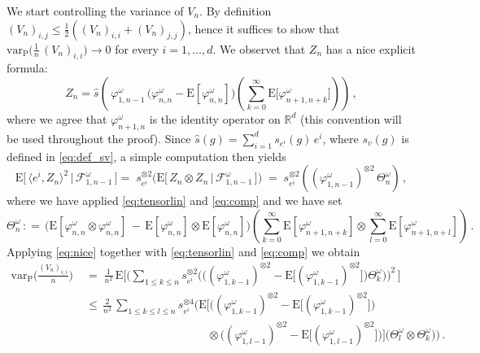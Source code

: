 \documentclass[a4paper,reqno,11pt]{amsart}
\numberwithin{equation}{section}
\newcommand{\cF}{{\ensuremath{\mathcal F}} }
\newcommand{\go}{\omega}
\newcommand{\R}{\mathbb{R}}
\def\bP{\ensuremath{\bs{\mathrm{P}}}}
\def\bE{\ensuremath{\bs{\mathrm{E}}}}
\def\bs{\boldsymbol}
\renewcommand{\phi}{\varphi}
\begin{document}
We start controlling the variance of $V_n$. By definition
$(V_n)_{i,j} \le \frac 12 ((V_n)_{i,i} + (V_n)_{j,j})$,
hence it suffices to show that
$\mathrm{var}_{\bP} \big( \frac 1n \, (V_n)_{i,i} \big) \to 0$
for every $i = 1, \ldots, d$.
We observet that $Z_n$ has a nice explicit formula:
\begin{equation}
Z_n = \hat s \left( \, \phi_{1,n-1}^\go
\, \big( \phi_{n,n}^\go - \bE [\phi_{n,n}^\go] \big) 
\left( \sum_{k=0}^\infty  \bE \big[ \phi_{n+1,n+k}^\go \big] \right) \right)\,,
\end{equation}
where we agree that $\phi_{n+1,n}^\go$ is the identity operator on $\R^d$
(this convention will be used throughout the proof).
Since $\hat s(g) = \sum_{i=1}^d s_{e^i}(g) \, e^i$,
where $s_v(g)$ is defined in \eqref{eq:def_sv}, a simple computation
then yields
\begin{equation} \label{eq:nice}
	\bE\big[\, \langle e^i,Z_n\rangle^2 \,\big|\, \cF_{1,n-1}^\go \,\big] 
	=\; s_{e^i}^{\otimes 2} \big(
	\bE\big[\, Z_n \otimes Z_n \,\big|\, \cF_{1,n-1}^\go \,\big] \big)
	\;=\; s_{e^i}^{\otimes 2}
	\left((\phi_{1,n-1}^\go)^{\otimes 2} \, \Theta^\go_n  \right) \,,
\end{equation}
where we have applied \eqref{eq:tensorlin} and \eqref{eq:comp} and we have set
\begin{equation}
\Theta^\go_n \,: =\,  \big( \bE[ \phi_{n,n}^\go \otimes \phi_{n,n}^\go] 
  \,-\, \bE [\phi_{n,n}^\go] \otimes \bE [\phi_{n,n}^\go] \big) \left(
  \sum_{k=0}^\infty \bE[\phi_{n+1,n+k}^\go] \otimes
  \sum_{l=0}^\infty  \bE [\phi_{n+1,n+l}^\go]  \right) \,.
\end{equation}
Applying \eqref{eq:nice} together with \eqref{eq:tensorlin} and \eqref{eq:comp}
we obtain
\begin{align}
	\mathrm{var}_{\bP} \bigg( \frac{(V_n)_{i,i}}{n} \bigg)
	& \;=\; \frac{1}{n^2} \, \bE \Bigg[ \Bigg( \sum_{1 \le k \le n} 
	s_{e^i}^{\otimes 2}
	\Big( \big( (\phi_{1,k-1}^\go)^{\otimes 2} 
	- \bE \big[ (\phi_{1,k-1}^\go)^{\otimes 2} \big] \big) \Theta^\go_k  \Big)
	\Bigg)^2\, \Bigg] \nonumber \\
	&\;\le\, \frac{2}{n^2} \, \sum_{1 \le k \le l \le n} 
	s_{e^i}^{\otimes 4} 	\Big( \bE \Big[ 
	\big( (\phi_{1,k-1}^\go)^{\otimes 2} - \bE \big[ (\phi_{1,k-1}^\go)^{\otimes 2} \big] 
	\big) \label{eq:bestia} \\
	& \qquad \qquad \qquad \qquad \qquad \quad
	\otimes \big( (\phi_{1,l-1}^\go)^{\otimes 2} - \bE\big[ (\phi_{1,l-1}^\go)^{\otimes 2}
	\big] \big) \Big]
	\big( \Theta^\go_l \otimes \Theta^\go_k \big) \Big) \,. \nonumber
\end{align}
\end{document}
